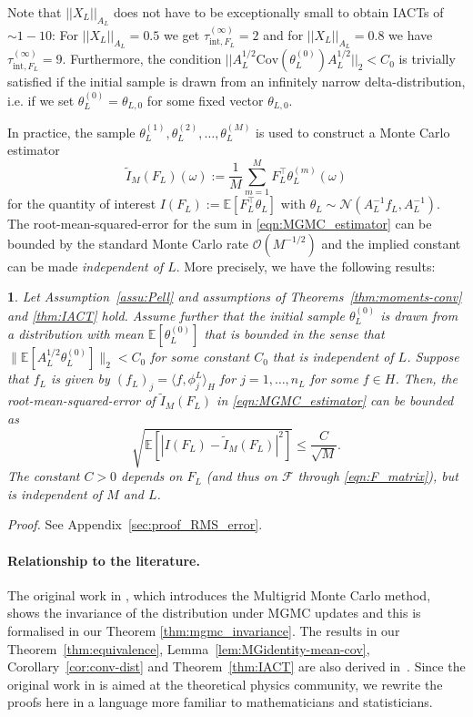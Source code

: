 \documentclass[11pt,english]{article}
\theoremstyle{plain}
\newtheorem{thm}{\protect\theoremname}[section]
\theoremstyle{plain}
\theoremstyle{plain}
\theoremstyle{plain}
\numberwithin{equation}{section}
\newcommand{\rev}[1]{#1}
\newcommand{\jg}[1]{#1}
\providecommand{\theoremname}{Theorem}
\begin{document}
\noindent
Note that $||X_{L}||_{A_{L}}$ does not have to be exceptionally small to obtain IACTs of $\sim1-10$: For $||X_{L}||_{A_{L}}=0.5$ we get
$\rev{\tau^{(\infty)}_{\mathrm{int},F_L}}=2$ and for $||X_{L}||_{A_{L}}=0.8$ we have $\rev{\tau^{(\infty)}_{\mathrm{int},F_L}}=9$. Furthermore, the condition $||A_L^{1/2}\mathrm{Cov}(\theta_L^{(0)})A_L^{1/2}||_2<C_0$ is trivially satisfied if the initial sample is drawn from an infinitely narrow delta-distribution, i.e. if we set $\theta_L^{(0)}=\theta_{L,0}$ for some fixed vector $\theta_{L,0}$.

In practice, the sample $\theta_L^{(1)}, \theta_L^{(2)},\dots,\theta_L^{(M)}$ is used to construct a Monte Carlo estimator
\begin{equation}
	\tilde{I}_{M}(F_L)(\omega):=\frac{1}{M}\sum_{m=1}^{M}F_L^\top \theta_{L}^{(m)}(\omega)\label{eqn:MGMC_estimator}
\end{equation}
for the quantity of interest
$I(F_L):=\mathbb{E}[F_L^\top \theta_{L}]$ with $\theta_{L}\sim\mathcal{N}(A_{L}^{-1}f_{L},A_{L}^{-1})$.
The root-mean-squared-error for the sum in \eqref{eqn:MGMC_estimator} can be  bounded by the standard Monte Carlo rate $\mathcal{O}(M^{-1/2})$ and the implied constant can be made \emph{independent of $L$}. More precisely, we have the following results:
\begin{thm}
	\label{thm:integration-error} Let Assumption~\ref{assu:Pell} and
	assumptions of Theorems~\ref{thm:moments-conv} and \ref{thm:IACT}
	hold. Assume further that the initial sample $\theta_{L}^{(0)}$ is
	drawn from a distribution with mean $\mathbb{E}[\theta_{L}^{(0)}]$
	that is bounded in the sense that $\|\mathbb{E}[A_{L}^{1/2}\theta_{L}^{(0)}]\|_{2}<C_{0}$
	for some constant $C_{0}$ that is independent of $L$. Suppose that
	$f_{L}$ is given by $(f_L)_j = \langle f,\phi_{j}^{L}\rangle_{H}$ for ${j=1,\dots,n_{L}}$ for some $f\in H$. Then, the root-mean-squared-error of $\tilde{I}_{M}(F_L)$ in \eqref{eqn:MGMC_estimator} can be bounded as
	\begin{equation}
		\sqrt{\mathbb{E}[|I(F_{L})-\tilde{I}_{M}(F_{L})|^{2}]}\leq\frac{C}{\sqrt{M}}.\label{eqn:integration_error}
	\end{equation}
	The constant $C>0$ depends on $F_L$ (and thus on $\mathcal{F}$ through \eqref{eqn:F_matrix}), but is independent
	of $M$ and $L$.
\end{thm}
\noindent\textit{Proof.} See Appendix~\ref{sec:proof_RMS_error}.
\paragraph{Relationship to the literature.}
The original work in \cite{goodman1989multigrid},  which introduces the Multigrid Monte Carlo method, \jg{shows} the invariance of the distribution under MGMC updates and this is formalised in our Theorem \ref{thm:mgmc_invariance}. The results in our Theorem~\ref{thm:equivalence}, Lemma~\ref{lem:MGidentity-mean-cov}, Corollary~\ref{cor:conv-dist} and Theorem~\ref{thm:IACT} are also derived in~\cite{goodman1989multigrid}. \jg{Since the original work in \cite{goodman1989multigrid} is aimed at the theoretical physics community, we rewrite the proofs here in a language more familiar to mathematicians and statisticians.}
\end{document}
